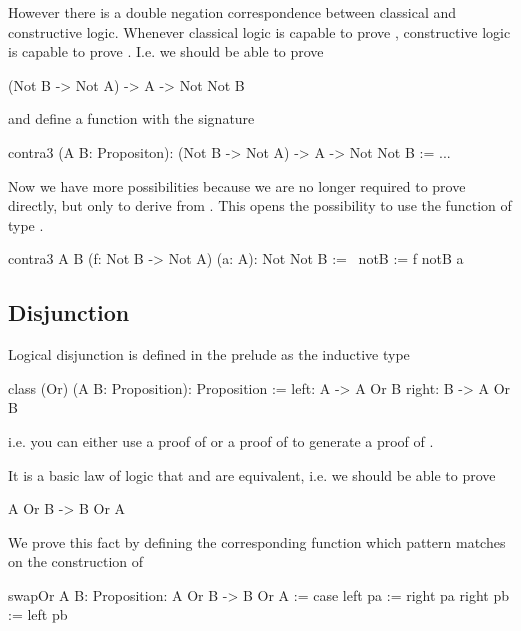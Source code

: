 However there is a double negation correspondence between classical and
constructive logic. Whenever classical logic is capable to prove ,
constructive logic is capable to prove . I.e. we should be able
to prove

\begin{alba}
    (Not B -> Not A) -> A -> Not Not B
\end{alba}
and define a function with the signature

\begin{alba}
    contra3 (A B: Propositon): (Not B -> Not A) -> A -> Not Not B :=
    ...
\end{alba}

Now we have more possibilities because we are no longer required to prove
 directly, but only to derive  from . This
opens the possibility to use the function of type .
%
\begin{alba}
    contra3 {A B} (f: Not B -> Not A) (a: A): Not Not B :=
        \ notB :=
            f notB a
\end{alba}











\subsection{Disjunction}

Logical disjunction is defined in the prelude as the inductive type
%
\begin{alba}
    class
        (Or) (A B: Proposition): Proposition
    :=
        left:  A -> A Or B
        right: B -> A Or B
\end{alba}
%
i.e. you can either use a proof of  or a proof of  to generate
a proof of .

It is a basic law of logic that  and  are
equivalent, i.e. we should be able to prove
%
\begin{alba}
  A Or B  ->  B Or A
\end{alba}
%
We prove this fact by defining the corresponding function which pattern
matches on the construction of 
%
\begin{alba}
    swapOr {A B: Proposition}: A Or B -> B Or A
    :=
        case
            left pa  := right pa
            right pb := left pb
\end{alba}

